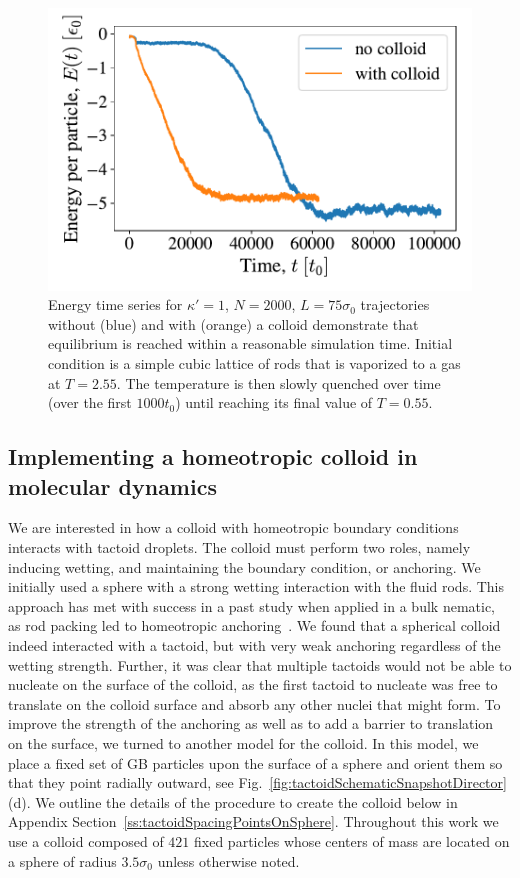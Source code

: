 \documentclass[%
 aip,
 amsmath,amssymb,
 reprint,%
]{revtex4-1}
\begin{document}
\begin{figure}[h]
\centering
\includegraphics[scale=0.57]{media/190812-gayBerneEnergyTimeSeries-kp1.pdf}
\caption{Energy time series for $\kappa'=1$, $N=2000$, $L=75\sigma_0$ trajectories without (blue) and with (orange) a colloid demonstrate that equilibrium is reached within a reasonable simulation time. Initial condition is a simple cubic lattice of rods that is vaporized to a gas at $T=2.55$. The temperature is then slowly quenched over time (over the first $1000 t_0$) until reaching its final value of $T=0.55$.}
\label{fig:tactoidKP1WSuTimeSeries}
\end{figure}

\subsection{Implementing a homeotropic colloid in molecular dynamics} \label{ss:tactoidBuildHomeotropicColloid}
We are interested in how a colloid with homeotropic boundary conditions interacts with tactoid droplets. The colloid must perform two roles, namely inducing wetting, and maintaining the boundary condition, or anchoring. We initially used a sphere with a strong wetting interaction with the fluid rods. This approach has met with success in a past study when applied in a bulk nematic, as rod packing led to homeotropic anchoring~\cite{Allen18}. We found that a spherical colloid indeed interacted with a tactoid, but with very weak anchoring regardless of the wetting strength. Further, it was clear that multiple tactoids would not be able to nucleate on the surface of the colloid, as the first tactoid to nucleate was free to translate on the colloid surface and absorb any other nuclei that might form. To improve the strength of the anchoring as well as to add a barrier to translation on the surface, we turned to another model for the colloid. In this model, we place a fixed set of GB particles upon the surface of a sphere and orient them so that they point radially outward, see Fig.~\ref{fig:tactoidSchematicSnapshotDirector}(d). We outline the details of the procedure to create the colloid below in Appendix Section~\ref{ss:tactoidSpacingPointsOnSphere}. Throughout this work we use a colloid composed of $421$ fixed particles whose centers of mass are located on a sphere of radius $3.5\sigma_0$ unless otherwise noted.
\end{document}
